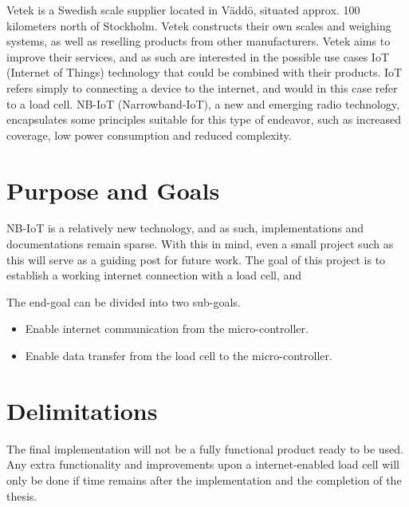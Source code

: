 Vetek is a Swedish scale supplier located in Väddö, situated approx. 100 kilometers north of Stockholm. Vetek constructs their own scales and weighing systems, as well as reselling products from other manufacturers. Vetek aims to improve their services, and as such are interested in the possible use cases IoT (Internet of Things) technology that could be combined with their products. IoT refers simply to connecting a device to the internet\cite{what_is_iot}, and would in this case refer to a load cell. NB-IoT (Narrowband-IoT), a new and emerging radio technology, encapsulates some principles suitable for this type of endeavor, such as increased coverage, low power consumption and reduced complexity.\cite{NB-overview}



\section{Purpose and Goals}
\iffalse
\begin{itemize}
	\item Write about the grand scheme of things
	\item Set the correct expectations
	\item What can I expect to learn if I keep on reading?
	\item What are the success criteria for this work?
	\item How will the work be evaluated?
\end{itemize}
\fi

NB-IoT is a relatively new technology, and as such, implementations and documentations remain sparse. With this in mind, even a small project such as this will serve as a guiding post for future work. The goal of this project is to establish a working internet connection with a load cell, and %

The end-goal can be divided into two sub-goals. 
\begin{itemize}
	\item Enable internet communication from the micro-controller.
	\item Enable data transfer from the load cell to the micro-controller.
\end{itemize}


\section{Delimitations}
\iffalse
\begin{itemize}
	\item Scale down expectations and clarify
\end{itemize}
\fi
The final implementation will not be a fully functional product ready to be used. Any extra functionality and improvements upon a internet-enabled load cell will only be done if time remains after the implementation and the completion of the thesis.